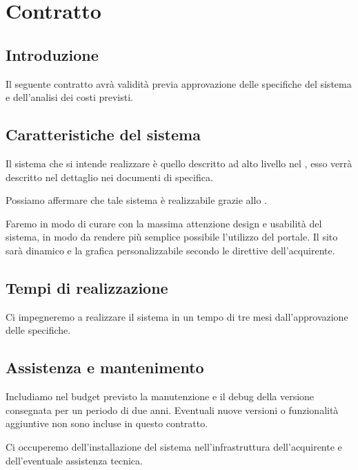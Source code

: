 \chapter{Contratto} 
\label{cha:contratto}

\section{Introduzione}
\label{sec:introduzione}
Il seguente contratto avrà validità previa approvazione delle specifiche del sistema e dell'analisi dei costi previsti.

\section{Caratteristiche del sistema} 
\label{sec:caratteristiche_del_sistema}
Il sistema che si intende realizzare è quello descritto ad alto livello nel , esso verrà descritto nel dettaglio nei documenti di specifica. 

Possiamo affermare che tale sistema è realizzabile grazie allo .

Faremo in modo di curare con la massima attenzione design e usabilità del sistema, in modo da rendere più semplice possibile l'utilizzo del portale. Il sito sarà dinamico e la grafica personalizzabile secondo le direttive dell'acquirente.


\section{Tempi di realizzazione} 
\label{sec:tempi_di_realizzazione}

Ci impegneremo a realizzare il sistema in un tempo di tre mesi dall'approvazione delle specifiche.

\section{Assistenza e mantenimento} 
\label{sec:assistenza_e_mantenimento}
Includiamo nel budget previsto la manutenzione e il debug della versione consegnata per un periodo di due anni. Eventuali nuove versioni o funzionalità aggiuntive non sono incluse in questo contratto. 

Ci occuperemo dell’installazione del sistema nell'infrastruttura dell'acquirente e dell'eventuale assistenza tecnica.



